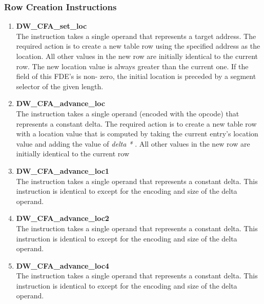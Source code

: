 \subsubsection{Row Creation Instructions}
\label{chap:rowcreationinstructions}
\begin{enumerate}[1. ]

\item \textbf{DW\_CFA\_set\_loc} \\
The  instruction 
takes a single operand that
represents a target address. The required action is to create a
new table row using the specified address as the location. All
other values in the new row are initially identical to the
current row. The new location value is always greater than
the current one. 
If the  field of this FDE's 
is non- zero, the initial location is preceded by a segment
selector of the given length.


\item \textbf{DW\_CFA\_advance\_loc} \\
The  instruction takes a single operand (encoded
with the opcode) that represents a constant delta. The required
action is to create a new table row with a location value that
is computed by taking the current entry\textquoteright s location value
and adding the value of 
\textit{delta * }. 
All
other values in the new row are initially identical to the
current row

\item \textbf{DW\_CFA\_advance\_loc1} \\
The  instruction takes a single 
operand that represents a constant delta. This instruction
is identical to  except for the encoding
and size of the delta operand.

\item \textbf{DW\_CFA\_advance\_loc2} \\
The  instruction takes a single
operand that represents a constant delta. This instruction
is identical to  except for the encoding
and size of the delta operand.

\item \textbf{DW\_CFA\_advance\_loc4} \\
The  instruction takes a single
operand that represents a constant delta. This instruction
is identical to  except for the encoding
and size of the delta operand.

\end{enumerate}

